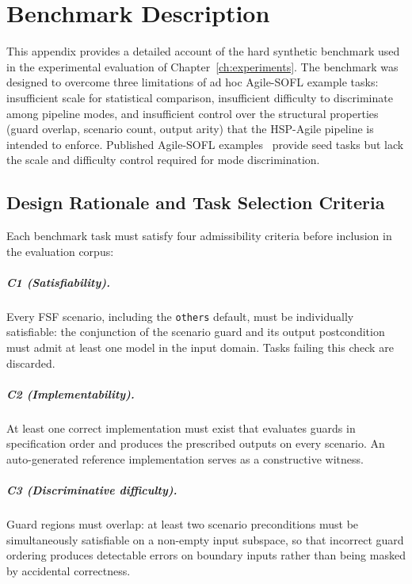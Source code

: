 ﻿\chapter{Benchmark Description}
\label{app:benchmark}

This appendix provides a detailed account of the hard synthetic benchmark
used in the experimental evaluation of Chapter~\ref{ch:experiments}.  The
benchmark was designed to overcome three limitations of ad hoc
Agile-SOFL example tasks: insufficient scale for statistical comparison,
insufficient difficulty to discriminate among pipeline modes, and
insufficient control over the structural properties (guard overlap, scenario
count, output arity) that the HSP-Agile pipeline is intended to enforce.
Published Agile-SOFL examples~\citep{liu2004soflbook,li2022qrs_companion} provide seed tasks but lack
the scale and difficulty control required for mode discrimination.

\section{Design Rationale and Task Selection Criteria}
\label{sec:bench:criteria}

Each benchmark task must satisfy four admissibility criteria before inclusion
in the evaluation corpus:

\paragraph{C1 (Satisfiability).}
Every FSF scenario, including the \texttt{others} default, must be
individually satisfiable: the conjunction of the scenario guard and
its output postcondition must admit at least one model in the input
domain.  Tasks failing this check are discarded.

\paragraph{C2 (Implementability).}
At least one correct implementation must exist that evaluates guards
in specification order and produces the prescribed outputs on every
scenario.  An auto-generated reference implementation serves as a
constructive witness.

\paragraph{C3 (Discriminative difficulty).}
Guard regions must overlap: at least two scenario preconditions must
be simultaneously satisfiable on a non-empty input subspace, so that
incorrect guard ordering produces detectable errors on boundary inputs
rather than being masked by accidental correctness.

